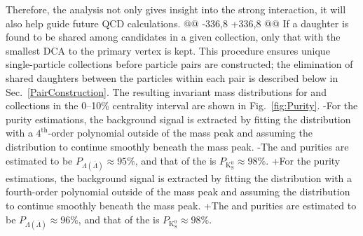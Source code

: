  Therefore, the \LamK analysis not only gives insight into the strong interaction, it will also help guide future QCD calculations.
@@ -336,8 +336,8 @@
 If a daughter is found to be shared among \Vz candidates in a given collection, only that with the smallest DCA to the primary vertex is kept.
 This procedure ensures unique single-particle collections before particle pairs are constructed; the elimination of shared daughters between the particles within each pair is described below in Sec.~\ref{PairConstruction}.
 The resulting invariant mass distributions for \Lam and \Ks collections in the 0--10\% centrality interval are shown in Fig.~\ref{fig:Purity}.
-For the purity estimations, the background signal is extracted by fitting the \minv distribution with a $4^{\mathrm{th}}$-order polynomial outside of the mass peak and assuming the distribution to continue smoothly beneath the mass peak.
-The \Lam and \ALam purities are estimated to be $P_{\Lambda(\overline{\Lambda})} \approx 95\%$, and that of the \Ks is $P_{\mathrm{K^{0}_{S}}} \approx 98\%$.
+For the purity estimations, the background signal is extracted by fitting the \minv distribution with a fourth-order polynomial outside of the mass peak and assuming the distribution to continue smoothly beneath the mass peak.
+The \Lam and \ALam purities are estimated to be $P_{\Lambda(\overline{\Lambda})} \approx 96\%$, and that of the \Ks is $P_{\mathrm{K^{0}_{S}}} \approx 98\%$.
 
